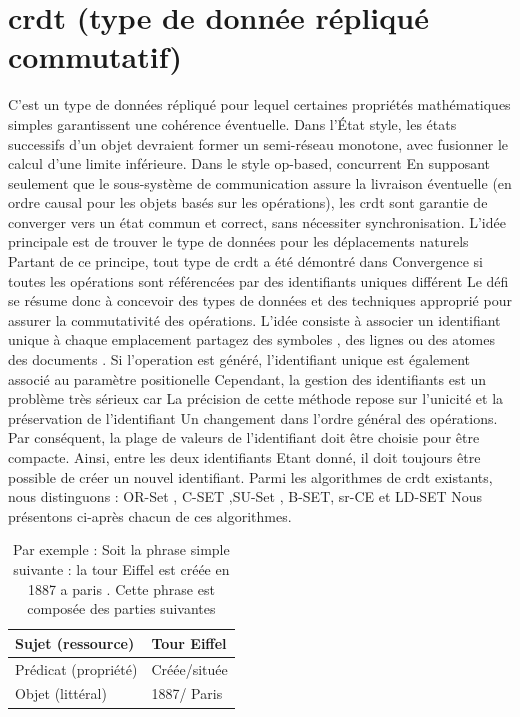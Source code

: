 \documentclass[12pt]{report}
\begin{document}
\section{\acs{crdt} (type de donnée répliqué commutatif)}
C'est un type de données répliqué pour lequel certaines propriétés mathématiques simples garantissent une cohérence
éventuelle. Dans l’État style, les états successifs d’un objet devraient former un semi-réseau monotone, avec fusionner le calcul
d’une limite inférieure. Dans le style op-based, concurrent En supposant seulement que le sous-système de communication
assure la livraison éventuelle (en ordre causal pour les objets basés sur les opérations), les \acs{crdt} sont garantie de converger
vers un état commun et correct, sans nécessiter synchronisation.
L'idée principale est de trouver le type de données pour les déplacements naturels
Partant de ce principe, tout type de \acs{crdt} a été démontré dans Convergence si toutes les opérations sont référencées par des
identifiants uniques différent Le défi se résume donc à concevoir des types de données et des techniques approprié pour
assurer la commutativité des opérations.
\cite{CRDT}
L'idée consiste à associer un identifiant unique à chaque emplacement partagez des symboles , des lignes ou des atomes des
documents . Si l’operation est généré, l'identifiant unique est également associé au paramètre positionelle Cependant, la
gestion des identifiants est un problème très sérieux car La précision de cette méthode repose sur l'unicité et la préservation de
l'identifiant Un changement dans l'ordre général des opérations. Par conséquent, la plage de valeurs de l'identifiant doit être
choisie pour être compacte. Ainsi, entre les deux identifiants Etant donné, il doit toujours être possible de créer un nouvel
identifiant.
Parmi les algorithmes de \acs{crdt} existants, nous distinguons : OR-Set , C-SET ,SU-Set , B-SET, sr-CE et LD-SET Nous
présentons ci-après chacun de ces algorithmes.
\begin{table}[h]
\caption{Par exemple : Soit la phrase simple suivante : la tour Eiffel est créée en 1887 a paris .
Cette phrase est composée des parties suivantes}
\label{table:crdt-example}
\centering
\begin{tabular}{|l|l|}
\hline
Sujet (ressource)    & Tour Eiffel  \\ \hline
Prédicat (propriété) & Créée/située \\ \hline
Objet (littéral)     & 1887/ Paris  \\ \hline
\end{tabular}
\end{table}
\end{document}
